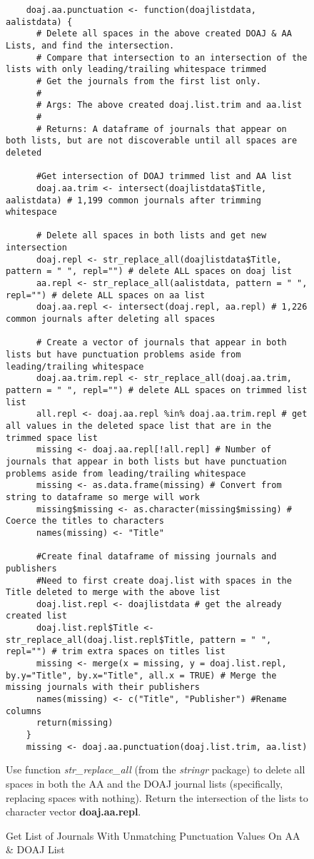 \documentclass{article}
\begin{document}
\begin{figure}[htpb]
	\centering
	\caption{Get List of Journals With Unmatching Punctuation Values On AA \& DOAJ List}
	\begin{lstlisting}
	doaj.aa.punctuation <- function(doajlistdata, aalistdata) {
	  # Delete all spaces in the above created DOAJ & AA Lists, and find the intersection.
	  # Compare that intersection to an intersection of the lists with only leading/trailing whitespace trimmed
	  # Get the journals from the first list only.
	  # 
	  # Args: The above created doaj.list.trim and aa.list
	  #
	  # Returns: A dataframe of journals that appear on both lists, but are not discoverable until all spaces are deleted
	  
	  #Get intersection of DOAJ trimmed list and AA list
	  doaj.aa.trim <- intersect(doajlistdata$Title, aalistdata) # 1,199 common journals after trimming whitespace
	  
	  # Delete all spaces in both lists and get new intersection
	  doaj.repl <- str_replace_all(doajlistdata$Title, pattern = " ", repl="") # delete ALL spaces on doaj list
	  aa.repl <- str_replace_all(aalistdata, pattern = " ", repl="") # delete ALL spaces on aa list
	  doaj.aa.repl <- intersect(doaj.repl, aa.repl) # 1,226 common journals after deleting all spaces
	  
	  # Create a vector of journals that appear in both lists but have punctuation problems aside from leading/trailing whitespace
	  doaj.aa.trim.repl <- str_replace_all(doaj.aa.trim, pattern = " ", repl="") # delete ALL spaces on trimmed list list
	  all.repl <- doaj.aa.repl %in% doaj.aa.trim.repl # get all values in the deleted space list that are in the trimmed space list
	  missing <- doaj.aa.repl[!all.repl] # Number of journals that appear in both lists but have punctuation problems aside from leading/trailing whitespace
	  missing <- as.data.frame(missing) # Convert from string to dataframe so merge will work
	  missing$missing <- as.character(missing$missing) # Coerce the titles to characters
	  names(missing) <- "Title"
	  
	  #Create final dataframe of missing journals and publishers
	  #Need to first create doaj.list with spaces in the Title deleted to merge with the above list
	  doaj.list.repl <- doajlistdata # get the already created list
	  doaj.list.repl$Title <- str_replace_all(doaj.list.repl$Title, pattern = " ", repl="") # trim extra spaces on titles list
	  missing <- merge(x = missing, y = doaj.list.repl, by.y="Title", by.x="Title", all.x = TRUE) # Merge the missing journals with their publishers
	  names(missing) <- c("Title", "Publisher") #Rename columns
	  return(missing)
	}
	missing <- doaj.aa.punctuation(doaj.list.trim, aa.list)
	\end{lstlisting}
	\footnotesize{
		Use function \textit{str\_replace\_all} (from the \textit{stringr} package) to delete all spaces in both the AA and the DOAJ journal lists (specifically, replacing spaces with nothing). 
		Return the intersection of the lists to character vector \textbf{doaj.aa.repl}.

			}

\end{figure}
\end{document}
